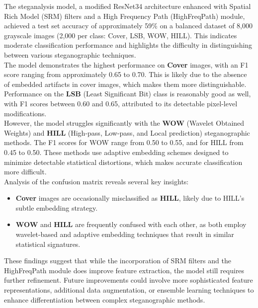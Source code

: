 \documentclass[12pt]{article}
\begin{document}
The steganalysis model, a modified ResNet34 architecture enhanced with Spatial Rich Model (SRM) filters and a High Frequency Path (HighFreqPath) module, achieved a test set accuracy of approximately 59\% on a balanced dataset of 8,000 grayscale images (2,000 per class: Cover, LSB, WOW, HILL). This indicates moderate classification performance and highlights the difficulty in distinguishing between various steganographic techniques.\vspace{0.3cm} \\
The model demonstrates the highest performance on \textbf{Cover} images, with an F1 score ranging from approximately 0.65 to 0.70. This is likely due to the absence of embedded artifacts in cover images, which makes them more distinguishable. Performance on the \textbf{LSB} (Least Significant Bit) class is reasonably good as well, with F1 scores between 0.60 and 0.65, attributed to its detectable pixel-level modifications.\vspace{0.3cm} \\
However, the model struggles significantly with the \textbf{WOW} (Wavelet Obtained Weights) and \textbf{HILL} (High-pass, Low-pass, and Local prediction) steganographic methods. The F1 scores for WOW range from 0.50 to 0.55, and for HILL from 0.45 to 0.50. These methods use adaptive embedding schemes designed to minimize detectable statistical distortions, which makes accurate classification more difficult.\vspace{0.5cm} \\
Analysis of the confusion matrix reveals several key insights:
\begin{itemize}
    \item \textbf{Cover} images are occasionally misclassified as \textbf{HILL}, likely due to HILL's subtle embedding strategy.
    \item \textbf{WOW} and \textbf{HILL} are frequently confused with each other, as both employ wavelet-based and adaptive embedding techniques that result in similar statistical signatures.\vspace{0.1cm} \\
\end{itemize}
These findings suggest that while the incorporation of SRM filters and the HighFreqPath module does improve feature extraction, the model still requires further refinement. Future improvements could involve more sophisticated feature representations, additional data augmentation, or ensemble learning techniques to enhance differentiation between complex steganographic methods.
\end{document}
